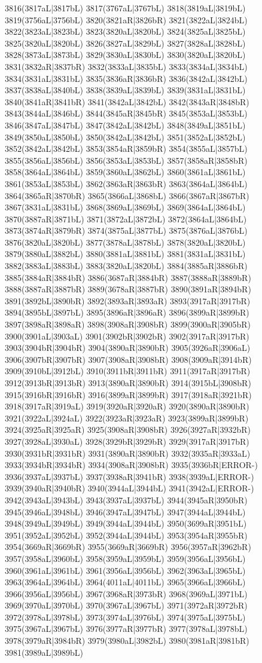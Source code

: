 3816(3817aL|3817bL) 3817(3767aL|3767bL) 3818(3819aL|3819bL) 3819(3756aL|3756bL) 3820(3821aR|3826bR) 3821(3822aL|3824bL) 3822(3823aL|3823bL) 3823(3820aL|3820bL) 3824(3825aL|3825bL) 3825(3820aL|3820bL) 3826(3827aL|3829bL) 3827(3828aL|3828bL) 3828(3873aL|3873bL) 3829(3830aL|3830bL) 3830(3820aL|3820bL) 3831(3832aR|3837bR) 3832(3833aL|3835bL) 3833(3834aL|3834bL) 3834(3831aL|3831bL) 3835(3836aR|3836bR) 3836(3842aL|3842bL) 3837(3838aL|3840bL) 3838(3839aL|3839bL) 3839(3831aL|3831bL) 3840(3841aR|3841bR) 3841(3842aL|3842bL) 3842(3843aR|3848bR) 3843(3844aL|3846bL) 3844(3845aR|3845bR) 3845(3853aL|3853bL) 3846(3847aL|3847bL) 3847(3842aL|3842bL) 3848(3849aL|3851bL) 3849(3850aL|3850bL) 3850(3842aL|3842bL) 3851(3852aL|3852bL) 3852(3842aL|3842bL) 3853(3854aR|3859bR) 3854(3855aL|3857bL) 3855(3856aL|3856bL) 3856(3853aL|3853bL) 3857(3858aR|3858bR) 3858(3864aL|3864bL) 3859(3860aL|3862bL) 3860(3861aL|3861bL) 3861(3853aL|3853bL) 3862(3863aR|3863bR) 3863(3864aL|3864bL) 3864(3865aR|3870bR) 3865(3866aL|3868bL) 3866(3867aR|3867bR) 3867(3831aL|3831bL) 3868(3869aL|3869bL) 3869(3864aL|3864bL) 3870(3887aR|3871bL) 3871(3872aL|3872bL) 3872(3864aL|3864bL) 3873(3874aR|3879bR) 3874(3875aL|3877bL) 3875(3876aL|3876bL) 3876(3820aL|3820bL) 3877(3878aL|3878bL) 3878(3820aL|3820bL) 3879(3880aL|3882bL) 3880(3881aL|3881bL) 3881(3831aL|3831bL) 3882(3883aL|3883bL) 3883(3820aL|3820bL) 3884(3885aR|3886bR) 3885(3884aR|3884bR) 3886(3687aR|3884bR) 3887(3888aR|3889bR) 3888(3887aR|3887bR) 3889(3678aR|3887bR) 3890(3891aR|3894bR) 3891(3892bL|3890bR) 3892(3893aR|3893aR) 3893(3917aR|3917bR) 3894(3895bL|3897bL) 3895(3896aR|3896aR) 3896(3899aR|3899bR) 3897(3898aR|3898aR) 3898(3908aR|3908bR) 3899(3900aR|3905bR) 3900(3901aL|3903aL) 3901(3902bR|3902bR) 3902(3917aR|3917bR) 3903(3904bR|3904bR) 3904(3890aR|3890bR) 3905(3926aR|3906aL) 3906(3907bR|3907bR) 3907(3908aR|3908bR) 3908(3909aR|3914bR) 3909(3910bL|3912bL) 3910(3911bR|3911bR) 3911(3917aR|3917bR) 3912(3913bR|3913bR) 3913(3890aR|3890bR) 3914(3915bL|3908bR) 3915(3916bR|3916bR) 3916(3899aR|3899bR) 3917(3918aR|3921bR) 3918(3917aR|3919aL) 3919(3920aR|3920aR) 3920(3890aR|3890bR) 3921(3922aL|3924aL) 3922(3923aR|3923aR) 3923(3899aR|3899bR) 3924(3925aR|3925aR) 3925(3908aR|3908bR) 3926(3927aR|3932bR) 3927(3928aL|3930aL) 3928(3929bR|3929bR) 3929(3917aR|3917bR) 3930(3931bR|3931bR) 3931(3890aR|3890bR) 3932(3935aR|3933aL) 3933(3934bR|3934bR) 3934(3908aR|3908bR) 3935(3936bR|ERROR-) 3936(3937aL|3937bL) 3937(3938aR|3941bR) 3938(3939aL|ERROR-) 3939(3940aR|3940bR) 3940(3944aL|3944bL) 3941(3942aL|ERROR-) 3942(3943aL|3943bL) 3943(3937aL|3937bL) 3944(3945aR|3950bR) 3945(3946aL|3948bL) 3946(3947aL|3947bL) 3947(3944aL|3944bL) 3948(3949aL|3949bL) 3949(3944aL|3944bL) 3950(3699aR|3951bL) 3951(3952aL|3952bL) 3952(3944aL|3944bL) 3953(3954aR|3955bR) 3954(3669aR|3669bR) 3955(3669aR|3669bR) 3956(3957aR|3962bR) 3957(3958aL|3960bL) 3958(3959aL|3959bL) 3959(3956aL|3956bL) 3960(3961aL|3961bL) 3961(3956aL|3956bL) 3962(3963aL|3965bL) 3963(3964aL|3964bL) 3964(4011aL|4011bL) 3965(3966aL|3966bL) 3966(3956aL|3956bL) 3967(3968aR|3973bR) 3968(3969aL|3971bL) 3969(3970aL|3970bL) 3970(3967aL|3967bL) 3971(3972aR|3972bR) 3972(3978aL|3978bL) 3973(3974aL|3976bL) 3974(3975aL|3975bL) 3975(3967aL|3967bL) 3976(3977aR|3977bR) 3977(3978aL|3978bL) 3978(3979aR|3984bR) 3979(3980aL|3982bL) 3980(3981aR|3981bR) 3981(3989aL|3989bL) 